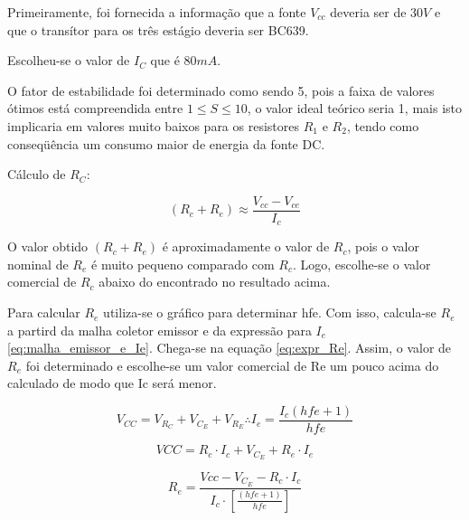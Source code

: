 \documentclass[openright]{normas-utf-tex} %
\begin{document}
Primeiramente, foi fornecida a informação que a fonte $V_{cc}$ deveria ser de $30 V$ e que o transítor para os três estágio deveria ser BC639.

Escolheu-se o valor de $I_C$ que é $80 mA$.

O fator de estabilidade foi determinado como sendo 5, pois a faixa de valores ótimos está compreendida entre $1 \leq S \leq 10$, o valor ideal
teórico seria 1, mais isto implicaria em valores muito baixos para os resistores $R_1$ e $R_2$,
tendo como conseqüência um consumo maior de energia da fonte DC.

Cálculo de $R_C$:

\begin{equation}
( R_c + R_e ) \approx \frac{V_{cc} - V_{ce}}{I_c}
\end{equation}

O valor obtido $( R_c + R_e )$ é aproximadamente o valor de $R_c$, pois o valor nominal de $R_e$ é muito pequeno comparado com $R_c$. Logo, escolhe-se o valor comercial de $R_c$ abaixo do encontrado no resultado acima.

%
%

Para calcular $R_e$ utiliza-se o gráfico para determinar hfe. Com isso, calcula-se $R_e$ a partird da malha coletor emissor e da expressão para $I_e$ \ref{eq:malha_emissor_e_Ie}. Chega-se na equação \ref{eq:expr_Re}. Assim, o valor de $R_e$ foi determinado e escolhe-se um
valor comercial de Re um pouco acima do calculado de modo que Ic será menor. 
%
%

\begin{equation}\label{eq:malha_emissor_e_Ie}
V_{CC} = V_{R_C} + V_{C_E} + V_{R_E}  \therefore  I_e =\frac{I_c \left(hfe + 1 \right)}{hfe}
\end{equation}

\begin{equation}
VCC = R_c\cdot I_c + V_{C_E} + R_e \cdot I_e
\end{equation}

\begin{equation}\label{eq:expr_Re}
R_e = \frac{Vcc - V_{C_E} - R_c \cdot I_c}{I_c \cdot \left[ \frac{\left(hfe + 1 \right)}{hfe} \right]}
\end{equation}

%
%
%
%
%
\end{document}
